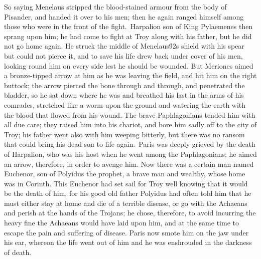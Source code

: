{So saying Menelaus stripped the blood-stained armour from the body of Pisander, and handed it over to his men; then he again ranged himself among those who were in the front of the fight.\
Harpalion son of King Pylaemenes then sprang upon him; he had come to fight at Troy along with his father, but he did not go home again. He struck the middle of Menelaus\'92s shield with his spear but could not pierce it, and to save his life drew back under cover of his men, looking round him on every side lest he should be wounded. But Meriones aimed a bronze-tipped arrow at him as he was leaving the field, and hit him on the right buttock; the arrow pierced the bone through and through, and penetrated the bladder, so he sat down where he was and breathed his last in the arms of his comrades, stretched like a worm upon the ground and watering the earth with the blood that flowed from his wound. The brave Paphlagonians tended him with all due care; they raised him into his chariot, and bore him sadly off to the city of Troy; his father went also with him weeping bitterly, but there was no ransom that could bring his dead son to life again.\
Paris was deeply grieved by the death of Harpalion, who was his host when he went among the Paphlagonians; he aimed an arrow, therefore, in order to avenge him. Now there was a certain man named Euchenor, son of Polyidus the prophet, a brave man and wealthy, whose home was in Corinth. This Euchenor had set sail for Troy well knowing that it would be the death of him, for his good old father Polyidus had often told him that he must either stay at home and die of a terrible disease, or go with the Achaeans and perish at the hands of the Trojans; he chose, therefore, to avoid incurring the heavy fine the Achaeans would have laid upon him, and at the same time to escape the pain and suffering of disease. Paris now smote him on the jaw under his ear, whereon the life went out of him and he was enshrouded in the darkness of death.\
}
